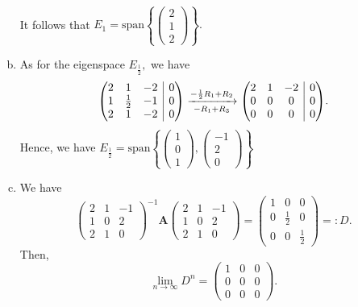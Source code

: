 \documentclass{article}
\makeatletter
\newcommand{\spn}{\text{span}}
\newenvironment{rowequmat}[1]{\left(\array{@{}#1@{}}}{\endarray\right)}
\makeatother
\begin{document}
\begin{enumerate}[(a)]
\begin{eqnarray*}
    \end{eqnarray*}
    It follows that $E_1=\spn\left\{\begin{pmatrix}2\\1\\2\end{pmatrix}\right\}.$
    \item As for the eigenspace $E_{\frac{1}{2}},$ we have
    $$\begin{rowequmat}{ccc|c}
     2 &  1 & -2 & 0 \\
     1 &  \frac{1}{2} & -1 & 0 \\
     2 &  1 & -2 & 0
    \end{rowequmat}\xrightarrow[-R_1+R_3]{-\frac{1}{2}R_1+R_2}\begin{rowequmat}{ccc|c}
     2 & 1 & -2 & 0 \\
     0 & 0 & 0 & 0 \\
     0 & 0 & 0 & 0
    \end{rowequmat}.$$
    Hence, we have $E_{\frac{1}{2}}=\spn\left\{\begin{pmatrix}1\\0\\1\end{pmatrix},\begin{pmatrix}-1\\2\\0\end{pmatrix}\right\}$
    \item We have $$\begin{pmatrix}2&1&-1\\1&0&2\\2&1&0\end{pmatrix}^{-1}\textbf{A}\begin{pmatrix}2&1&-1\\1&0&2\\2&1&0\end{pmatrix}=\begin{pmatrix}1&0&0\\0&\frac{1}{2}&0\\0&0&\frac{1}{2}\end{pmatrix}=:D.$$
    Then, $$\lim_{n\to\infty}D^n=\begin{pmatrix}1&0&0\\0&0&0\\0&0&0\end{pmatrix}.$$
    

\end{enumerate}
\end{document}
